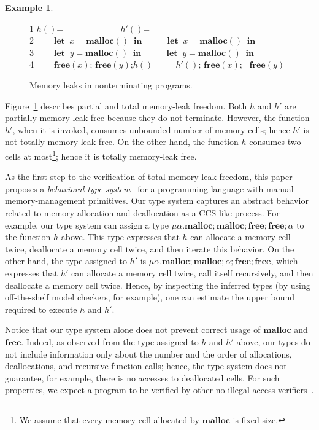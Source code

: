 \documentclass[english]{jssst_ppl} %
\newcommand\LET{\mathbf{let}\;}
\newcommand\IN{\mathbf{in}\;}
\newcommand\Rtab{\; \; \; \;}
\newcommand\MALLOC{\mathbf{malloc()}\;}
\newcommand\Malloc{\mathbf{malloc}}
\newcommand\Free{\mathbf{free}}
\newcommand\Cirx{(x)}
\newcommand\dtb{\;\;\ \;\;\ \;\;\ \;\;\  }
\newcommand\TSEQ{;\!}
\theoremstyle{definition}
\newtheorem{exmp}{Example}[section]
\begin{document}
\begin{exmp}\label{ex:ex1}
\begin{figure}[h]
1  \Rtab $h()$= \dtb \dtb\dtb\Rtab$h'()$= \\
2  \dtb $\LET \; x = \MALLOC  \; \IN$ \dtb \Rtab$\LET \; x = \MALLOC  \; \IN$\\
3  \dtb $\LET \; y = \MALLOC  \; \IN$ \dtb \Rtab$\LET \; y = \MALLOC  \; \IN$\\
4  \dtb $\Free(x)$; $\Free(y) $;\;$h()$ \dtb \Rtab$h'()$; $\Free\Cirx$; \ $\Free(y)$
\caption{Memory leaks in nonterminating programs.}
\label{ex:np}
\end{figure}
Figure~\ref{ex:np} describes partial and total memory-leak freedom.
Both \(h\) and \(h'\) are partially memory-leak free because they do
not terminate.  However, the function \(h'\), when it is invoked,
consumes unbounded number of memory cells; hence \(h'\) is not totally
memory-leak free.  On the other hand, the function \(h\) consumes two
cells at most\footnote{We assume that every memory cell allocated by
  \(\Malloc\) is fixed size.}; hence it is totally memory-leak free.
\end{exmp}

As the first step to the verification of total memory-leak freedom,
this paper proposes a \emph{behavioral type system}~\cite{} for a
programming language with manual memory-management primitives.  Our
type system captures an abstract behavior related to memory allocation
and deallocation as a CCS-like process.  For example, our type system
can assign a type \(
\mu\alpha.\Malloc\TSEQ\Malloc\TSEQ\Free\TSEQ\Free\TSEQ\alpha\) to the
function \(h\) above.  This type expresses that \(h\) can allocate a
memory cell twice, deallocate a memory cell twice, and then iterate
this behavior.  On the other hand, the type assigned to \(h'\) is
\(\mu\alpha.\Malloc\TSEQ\Malloc\TSEQ\alpha\TSEQ\Free\TSEQ\Free\),
which expresses that \(h'\) can allocate a memory cell twice, call
itself recursively, and then deallocate a memory cell twice.  Hence,
by inspecting the inferred types (by using off-the-shelf model
checkers, for example), one can estimate the upper bound required to
execute \(h\) and \(h'\).

Notice that our type system alone does not prevent correct usage of
\(\Malloc\) and \(\Free\).  Indeed, as observed from the type assigned
to \(h\) and \(h'\) above, our types do not include information only
about the number and the order of allocations, deallocations, and
recursive function calls; hence, the type system does not guarantee,
for example, there is no accesses to deallocated cells.  For such
properties, we expect a program to be verified by other
no-illegal-access verifiers~\cite{}.
\end{document}
